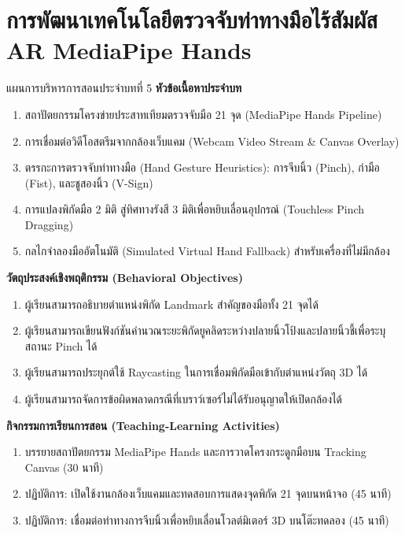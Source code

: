 \chapter{การพัฒนาเทคโนโลยีตรวจจับท่าทางมือไร้สัมผัส AR MediaPipe Hands}
\label{chap:ch05}

\begin{teachingplan}{แผนการบริหารการสอนประจำบทที่ 5}
\noindent\textbf{หัวข้อเนื้อหาประจำบท}
\begin{enumerate}[leftmargin=1.5em, itemsep=2pt]
    \item สถาปัตยกรรมโครงข่ายประสาทเทียมตรวจจับมือ 21 จุด (MediaPipe Hands Pipeline)
    \item การเชื่อมต่อวิดีโอสตรีมจากกล้องเว็บแคม (Webcam Video Stream \& Canvas Overlay)
    \item ตรรกะการตรวจจับท่าทางมือ (Hand Gesture Heuristics): การจีบนิ้ว (Pinch), กำมือ (Fist), และชูสองนิ้ว (V-Sign)
    \item การแปลงพิกัดมือ 2 มิติ สู่ทิศทางรังสี 3 มิติเพื่อหยิบเลื่อนอุปกรณ์ (Touchless Pinch Dragging)
    \item กลไกจำลองมืออัตโนมัติ (Simulated Virtual Hand Fallback) สำหรับเครื่องที่ไม่มีกล้อง
\end{enumerate}

\noindent\textbf{วัตถุประสงค์เชิงพฤติกรรม (Behavioral Objectives)}
\begin{enumerate}[leftmargin=1.5em, itemsep=2pt]
    \item ผู้เรียนสามารถอธิบายตำแหน่งพิกัด Landmark สำคัญของมือทั้ง 21 จุดได้
    \item ผู้เรียนสามารถเขียนฟังก์ชันคำนวณระยะพิกัดยูคลิดระหว่างปลายนิ้วโป้งและปลายนิ้วชี้เพื่อระบุสถานะ Pinch ได้
    \item ผู้เรียนสามารถประยุกต์ใช้ Raycasting ในการเชื่อมพิกัดมือเข้ากับตำแหน่งวัตถุ 3D ได้
    \item ผู้เรียนสามารถจัดการข้อผิดพลาดกรณีที่เบราว์เซอร์ไม่ได้รับอนุญาตให้เปิดกล้องได้
\end{enumerate}

\noindent\textbf{กิจกรรมการเรียนการสอน (Teaching-Learning Activities)}
\begin{enumerate}[leftmargin=1.5em, itemsep=2pt]
    \item บรรยายสถาปัตยกรรม MediaPipe Hands และการวาดโครงกระดูกมือบน Tracking Canvas (30 นาที)
    \item ปฏิบัติการ: เปิดใช้งานกล้องเว็บแคมและทดสอบการแสดงจุดพิกัด 21 จุดบนหน้าจอ (45 นาที)
    \item ปฏิบัติการ: เชื่อมต่อท่าทางการจีบนิ้วเพื่อหยิบเลื่อนโวลต์มิเตอร์ 3D บนโต๊ะทดลอง (45 นาที)
\end{enumerate}


\end{teachingplan}
